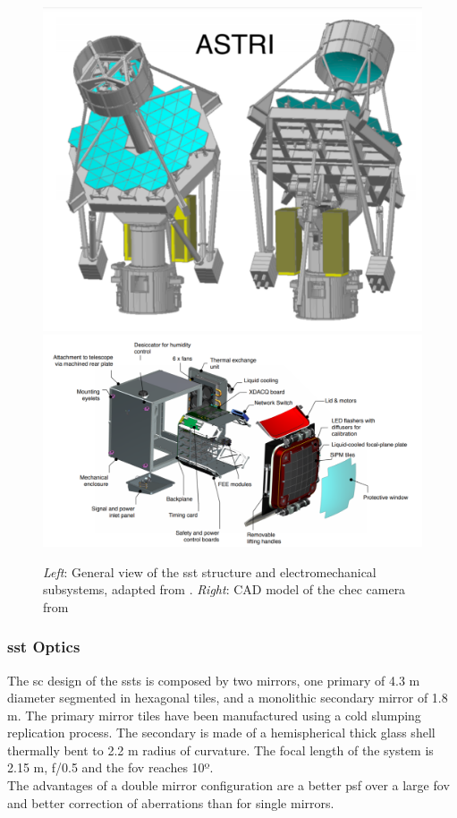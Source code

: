 \documentclass[main.tex]{subfiles}
\begin{document}
    
\begin{figure}[!htb]
  \includegraphics[width=\linewidth]{Pictures/ASTRI.pdf}
  \endminipage\hfill
  \includegraphics[width=\linewidth]{Pictures/CHECcam.pdf}
  \endminipage\hfill
  \caption{\label{fig:SST} \textit{Left}: General view of the \gls{sst} structure and electromechanical subsystems, adapted from \cite{2013SSTstruct}. \textit{Right}: CAD model of the \gls{chec} camera from \cite{2017CHECcam} }
\end{figure}

\subsubsection{\gls{sst} Optics}

The \gls{sc} design of the \glspl{sst} is composed by two mirrors, one primary of 4.3 m diameter segmented in hexagonal tiles, and a monolithic secondary mirror of 1.8 m. The primary mirror tiles have been manufactured using a cold slumping replication process. The secondary is made of a hemispherical thick glass shell thermally bent to 2.2 m radius of curvature. The focal length of the system is 2.15 m, f/0.5 and the \gls{fov} reaches 10º.\\
The advantages of a double mirror configuration are a better \gls{psf} over a large \gls{fov} and better correction of aberrations \cite{2017ASTRItels} than for single mirrors.
\end{document}
